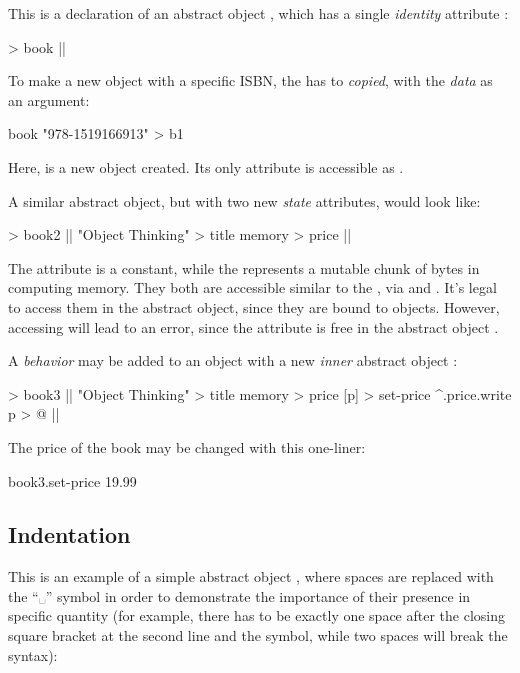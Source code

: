 This is a declaration of an abstract object ,
which has a single \emph{identity} attribute :

\begin{ffcode}
[isbn] > book |$\label{ln:book}$|
\end{ffcode}

To make a new object with a specific ISBN, the 
has to \emph{copied}, with the \emph{data} as an argument:

\begin{ffcode}
book "978-1519166913" > b1
\end{ffcode}

Here,  is a new object created.
Its only attribute is accessible as .

A similar abstract object, but with two new \emph{state} attributes, would
look like:

\begin{ffcode}
[isbn] > book2  |$\label{ln:book2}$|
  "Object Thinking" > title
  memory > price |$\label{ln:book2-end}$|
\end{ffcode}

The attribute  is a constant, while the 
represents a mutable chunk of bytes in computing memory. They both are
accessible similar to the , via 
and . It's legal to access them in the abstract
object, since they are bound to objects. However, accessing 
will lead to an error, since the attribute  is free
in the abstract object .

A \emph{behavior} may be added to an object with a new \emph{inner}
abstract object :

\begin{ffcode}
[isbn] > book3 |$\label{ln:book3}$|
  "Object Thinking" > title
  memory > price
  [p] > set-price
    ^.price.write p > @ |$\label{ln:book3-end}$|
\end{ffcode}

The price of the book may be changed with this one-liner:

\begin{ffcode}
book3.set-price 19.99
\end{ffcode}

\subsection{Indentation}

This is an example of a simple abstract object , where
spaces are replaced with the ``␣'' symbol in order to demonstrate
the importance of their presence in specific quantity
(for example, there has to be exactly one space after the closing square bracket at the
second line and the \ff{>} symbol, while two spaces will break the syntax):

